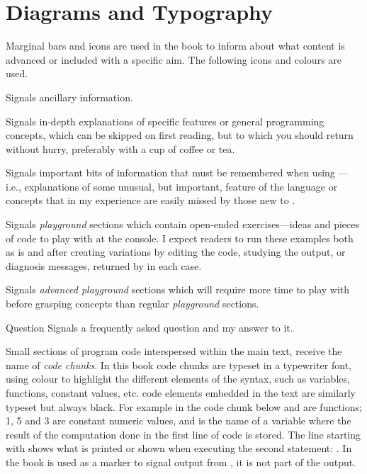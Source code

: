 \documentclass[krantz2]{krantz}\usepackage{knitr}
\begin{document}
\section{Diagrams and Typography}

Marginal bars and icons are used in the book to inform about what content is advanced or included with a specific aim. The following icons and colours are used.

\begin{infobox}
Signals ancillary information.
\end{infobox}

\begin{explainbox}
Signals in-depth explanations of specific \Rlang features or general programming concepts, which can be skipped on first reading, but to which you should return without hurry, preferably with a cup of coffee or tea.
\end{explainbox}

\begin{warningbox}
Signals important bits of information that must be remembered when using \Rlang---i.e., explanations of some unusual, but important, feature of the language or concepts that in my experience are easily missed by those new to \Rlang.
\end{warningbox}

\begin{playground}
Signals \emph{playground} sections which contain open-ended exercises---ideas and pieces of \Rlang code to play with at the \Rlang console. I expect readers to run these examples both as is and after creating variations by editing the code, studying the output, or diagnosis messages, returned by \Rlang in each case.
\end{playground}

\begin{advplayground}
Signals \emph{advanced playground} sections which will require more time to play with before grasping concepts than regular \emph{playground} sections.
\end{advplayground}

\begin{faqboxNI}{Question}
Signals a frequently asked question and my answer to it.
\end{faqboxNI}

Small sections of program code interspersed within the main text, receive the name of \emph{code chunks}. In this book \Rlang code chunks are typeset in a typewriter font, using colour to highlight the different elements of the syntax, such as variables, functions, constant values, etc. \Rlang code elements embedded in the text are similarly typeset but always black. For example in the code chunk below  and  are functions; 1, 5 and 3 are constant numeric values, and  is the name of a variable where the result of the computation done in the first line of code is stored. The line starting with \code{\#\# } shows what is printed or shown when executing the second statement: . In the book \code{\#\# } is used as a marker to signal output from \Rlang, it is not part of the output.
\end{document}
